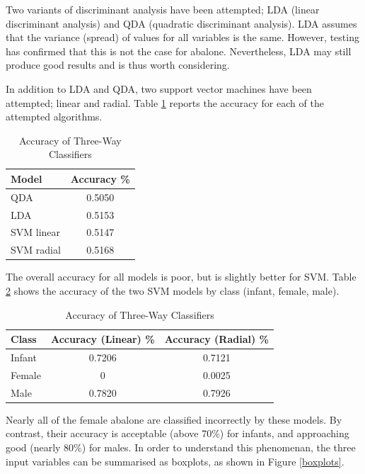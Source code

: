 \documentclass[11pt, a4paper]{article}
\begin{document}
    Two variants of discriminant analysis have been attempted; LDA (linear discriminant analysis) and QDA (quadratic discriminant analysis). LDA assumes that the variance (spread) of values for all variables is the same. However, testing has confirmed that this is not the case for abalone. Nevertheless, LDA may still produce good results and is thus worth considering.

    In addition to LDA and QDA, two support vector machines have been attempted; linear and radial. Table \ref{three-way} reports the accuracy for each of the attempted algorithms.

    \begin{table}[ht]
        \centering
        \begin{tabular}{|l|c|}
            \hline
            Model & Accuracy \% \\
            \hline
            QDA & 0.5050 \\
            LDA & 0.5153 \\
            SVM linear & 0.5147 \\
            SVM radial & 0.5168 \\
            \hline
        \end{tabular}
        \caption{Accuracy of Three-Way Classifiers}
        \label{three-way}
    \end{table}

    The overall accuracy for all models is poor, but is slightly better for SVM. Table \ref{svm-acc} shows the accuracy of the two SVM models by class (infant, female, male).

    \begin{table}[ht]
        \centering
        \begin{tabular}{|l|c|c|}
            \hline
            Class & Accuracy (Linear) \% & Accuracy (Radial) \% \\
            \hline
            Infant & 0.7206 & 0.7121 \\
            Female & 0 & 0.0025 \\
            Male & 0.7820 & 0.7926 \\
            \hline
        \end{tabular}
        \caption{Accuracy of Three-Way Classifiers}
        \label{svm-acc}
    \end{table}

    Nearly all of the female abalone are classified incorrectly by these models. By contrast, their accuracy is acceptable (above 70\%) for infants, and approaching good (nearly 80\%) for males. In order to understand this phenomenan, the three input variables can be summarised as boxplots, as shown in Figure \ref{boxplots}.
\end{document}
